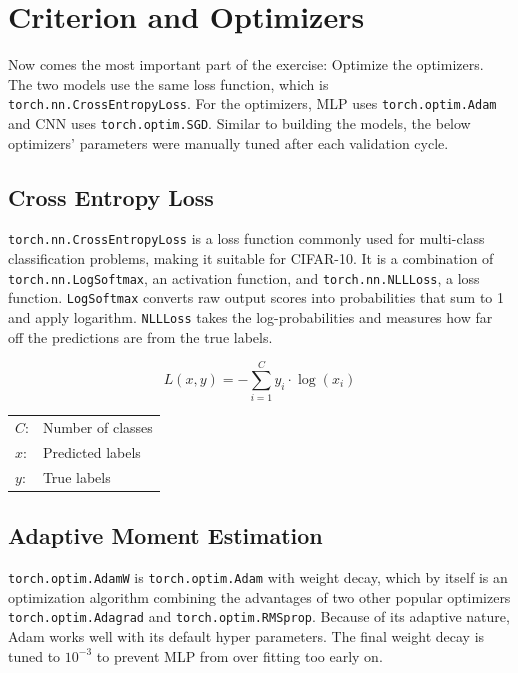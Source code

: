 \documentclass{report}
\begin{document}
\section{Criterion and Optimizers}
Now comes the most important part of the exercise: Optimize the optimizers. The two models use the same loss 
function, which is \texttt{torch.nn.CrossEntropyLoss}. For the optimizers, MLP uses \texttt{torch.optim.Adam} and CNN 
uses \texttt{torch.optim.SGD}. Similar to building the models, the below optimizers' parameters were manually 
tuned after each validation cycle.

\subsection{Cross Entropy Loss}
\texttt{torch.nn.CrossEntropyLoss} is a loss function commonly used for multi-class classification problems, making 
it suitable for CIFAR-10. It is a combination of \texttt{torch.nn.LogSoftmax}, an activation function, and 
\texttt{torch.nn.NLLLoss}, a loss function. \texttt{LogSoftmax} converts raw output scores into probabilities that sum to 
1 and apply logarithm. \texttt{NLLLoss} takes the log-probabilities and measures how far off the predictions are from 
the true labels. 

\[ L(x, y) = - \sum_{i=1}^{C} y_i \cdot \log(x_i) \]

\begin{center}
    \begin{tabular}{ll}
        $C$: & Number of classes  \\    
        $x$: & Predicted labels   \\
        $y$: & True labels        \\
    \end{tabular}
\end{center}

\subsection{Adaptive Moment Estimation}
\texttt{torch.optim.AdamW} is \texttt{torch.optim.Adam} with weight decay, which by itself is an optimization algorithm 
combining the advantages of two other popular optimizers \texttt{torch.optim.Adagrad} and \texttt{torch.optim.RMSprop}. 
Because of its adaptive nature, Adam works well with its default hyper parameters. The final weight decay is tuned to 
$10^{-3}$ to prevent MLP from over fitting too early on.
\end{document}
